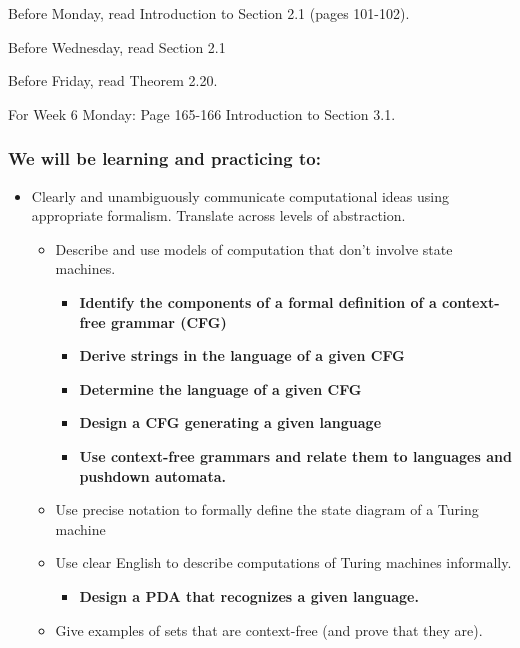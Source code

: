 Before Monday, read Introduction to Section 2.1 (pages 101-102).

Before Wednesday, read Section 2.1

Before Friday, read Theorem 2.20.

For Week 6 Monday: Page 165-166 Introduction to Section 3.1.

\vspace{-20pt}

\subsubsection*{We will be learning and practicing to:}
\vspace{-20pt}

\begin{itemize}
    \item Clearly and unambiguously communicate computational ideas using appropriate formalism. Translate across levels of abstraction.
    \begin{itemize}
        \item Describe and use models of computation that don't involve state machines.
        \begin{itemize}
            \item {\bf Identify the components of a formal definition of a context-free grammar (CFG)}
            \item {\bf Derive strings in the language of a given CFG}
            \item {\bf Determine the language of a given CFG}
            \item {\bf Design a CFG generating a given language}
            \item {\bf Use context-free grammars and relate them to languages and pushdown automata.}
        \end{itemize}
        \item Use precise notation to formally define the state diagram of a Turing machine
        \item Use clear English to describe computations of Turing machines informally.
        \begin{itemize}
            \item {\bf Design a PDA that recognizes a given language.}
         \end{itemize}
       \item Give examples of sets that are context-free (and prove that they are).
       \begin{itemize}

\end{itemize}
\end{itemize}
\end{itemize}
